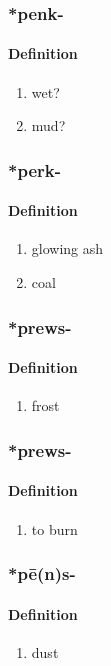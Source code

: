 \subsubsection{\**penk-}
\paragraph{Definition}
\begin{enumerate}
\item wet?
\item mud?
\end{enumerate}
\subsubsection{\**perk-}
\paragraph{Definition}
\begin{enumerate}
\item glowing ash
\item coal
\end{enumerate}
\subsubsection{\**prews-}
\paragraph{Definition}
\begin{enumerate}
\item frost
\end{enumerate}
\subsubsection{\**prews-}
\paragraph{Definition}
\begin{enumerate}
\item to burn
\end{enumerate}
\subsubsection{\**pē(n)s-}
\paragraph{Definition}
\begin{enumerate}
\item dust
\end{enumerate}
